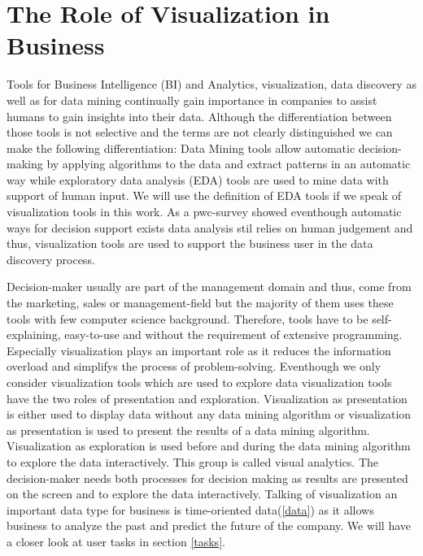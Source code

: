 \section{The Role of Visualization in Business} \label{BIV}
Tools for Business Intelligence (BI) and Analytics, visualization, data discovery as well as for data mining continually gain importance in companies to assist humans to gain insights into their data. Although the differentiation between those tools is not selective and the terms are not clearly distinguished we can make the following differentiation: Data Mining tools allow automatic decision-making by applying algorithms to the data and extract patterns in an automatic way\cite{Goebel1999} while exploratory data analysis (EDA) tools are used to mine data with support of human input. We will use the definition of EDA tools if we speak of visualization tools in this work. As a pwc-survey showed eventhough automatic ways for decision support exists data analysis stil relies on human judgement and thus\cite{PwC2016}, visualization tools are used to support the business user in the data discovery process.

Decision-maker usually are part of the management domain and thus, come from the marketing, sales or management-field but the majority of them uses these tools with few computer science background. Therefore, tools have to be self-explaining, easy-to-use \cite{Crapo2000} and without the requirement of extensive programming. Especially visualization plays an important role as it reduces the information overload\cite{Keima} and simplifys the process of problem-solving\cite{Zhang}. Eventhough we only consider visualization tools which are used to explore data visualization tools have the two roles of presentation and exploration\cite{Crapo2000}. Visualization as presentation is either used to display data without any data mining algorithm or visualization as presentation is used to present the results of a data mining algorithm. Visualization as exploration is used before and during the data mining algorithm to explore the data interactively. This group is called visual analytics. The decision-maker needs both processes for decision making as results are presented on the screen and to explore the data interactively\cite{Ware2012a}. 
Talking of visualization an important data type for business is time-oriented data(\ref{data}) as it allows business to analyze the past and predict the future of the company\cite{Ao2010}. We will have a closer look at user tasks in section \ref{tasks}.
 
